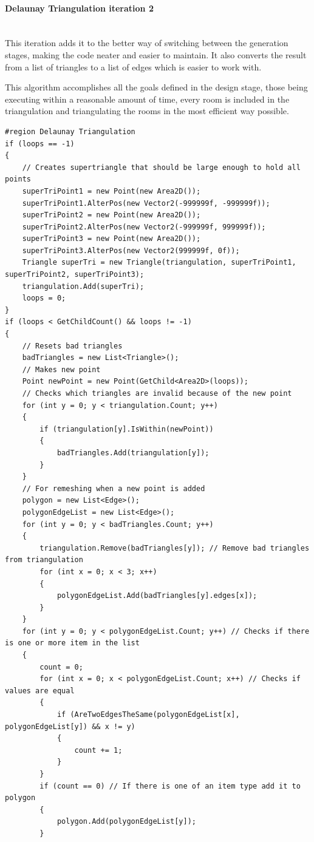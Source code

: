 \documentclass{article}
\newcommand{\parBr}{\vspace{5mm}}%
\newcommand{\myparagraph}[1]{\paragraph{#1}\mbox{}\\} %
\begin{document}
\myparagraph{Delaunay Triangulation iteration 2}
This iteration adds it to the better way of switching between the generation stages, making the code neater and easier to maintain. It also converts the result from a list of triangles to a list of edges which is easier to work with.

\parBr

This algorithm accomplishes all the goals defined in the design stage, those being executing within a reasonable amount of time, every room is included in the triangulation and triangulating the rooms in the most efficient way possible.
\begin{lstlisting}
#region Delaunay Triangulation
if (loops == -1)
{
    // Creates supertriangle that should be large enough to hold all points
    superTriPoint1 = new Point(new Area2D());
    superTriPoint1.AlterPos(new Vector2(-999999f, -999999f));
    superTriPoint2 = new Point(new Area2D());
    superTriPoint2.AlterPos(new Vector2(-999999f, 999999f));
    superTriPoint3 = new Point(new Area2D());
    superTriPoint3.AlterPos(new Vector2(999999f, 0f));
    Triangle superTri = new Triangle(triangulation, superTriPoint1, superTriPoint2, superTriPoint3);
    triangulation.Add(superTri);
    loops = 0;
}
if (loops < GetChildCount() && loops != -1)
{
    // Resets bad triangles
    badTriangles = new List<Triangle>();
    // Makes new point
    Point newPoint = new Point(GetChild<Area2D>(loops));
    // Checks which triangles are invalid because of the new point
    for (int y = 0; y < triangulation.Count; y++)
    {
        if (triangulation[y].IsWithin(newPoint))
        {
            badTriangles.Add(triangulation[y]);
        }
    }
    // For remeshing when a new point is added
    polygon = new List<Edge>();
    polygonEdgeList = new List<Edge>();
    for (int y = 0; y < badTriangles.Count; y++)
    {
        triangulation.Remove(badTriangles[y]); // Remove bad triangles from triangulation
        for (int x = 0; x < 3; x++)
        {
            polygonEdgeList.Add(badTriangles[y].edges[x]);
        }
    }
    for (int y = 0; y < polygonEdgeList.Count; y++) // Checks if there is one or more item in the list
    {
        count = 0;
        for (int x = 0; x < polygonEdgeList.Count; x++) // Checks if values are equal
        {
            if (AreTwoEdgesTheSame(polygonEdgeList[x], polygonEdgeList[y]) && x != y)
            {
                count += 1;
            }
        }
        if (count == 0) // If there is one of an item type add it to polygon
        {
            polygon.Add(polygonEdgeList[y]);
        }

\end{lstlisting}
\end{document}
